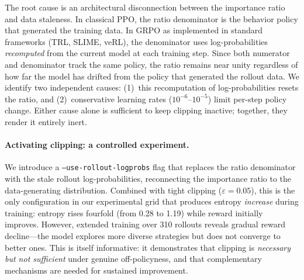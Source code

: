 The root cause is an architectural disconnection between the importance ratio and data staleness.
In classical PPO, the ratio denominator is the behavior policy that generated the training data.
In GRPO as implemented in standard frameworks (TRL, SLIME, veRL), the denominator uses log-probabilities \emph{recomputed} from the current model at each training step.
Since both numerator and denominator track the same policy, the ratio remains near unity regardless of how far the model has drifted from the policy that generated the rollout data.
We identify two independent causes: (1)~this recomputation of log-probabilities resets the ratio, and (2)~conservative learning rates ($10^{-6}$--$10^{-5}$) limit per-step policy change.
Either cause alone is sufficient to keep clipping inactive; together, they render it entirely inert.

\paragraph{Activating clipping: a controlled experiment.}
We introduce a \texttt{--use-rollout-logprobs} flag that replaces the ratio denominator with the stale rollout log-probabilities, reconnecting the importance ratio to the data-generating distribution.
Combined with tight clipping ($\varepsilon = 0.05$), this is the only configuration in our experimental grid that produces entropy \emph{increase} during training: entropy rises fourfold (from 0.28 to 1.19) while reward initially improves.
However, extended training over 310 rollouts reveals gradual reward decline---the model explores more diverse strategies but does not converge to better ones.
This is itself informative: it demonstrates that clipping is \emph{necessary but not sufficient} under genuine off-policyness, and that complementary mechanisms are needed for sustained improvement.

